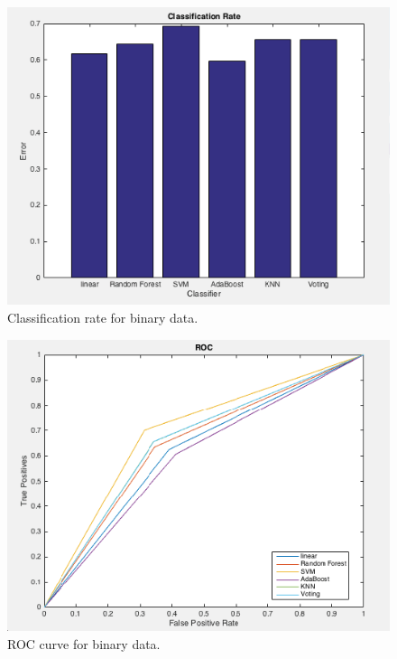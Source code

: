\documentclass[11pt]{article} %
\begin{document}
\begin{figure}[!htb]
	\includegraphics{BinBar}
	\caption{Classification rate for binary data.}
\end{figure}
\begin{figure}
	\includegraphics{BinROC}
	\caption{ROC curve for binary data.}
\end{figure}
\newpage
\end{document}

